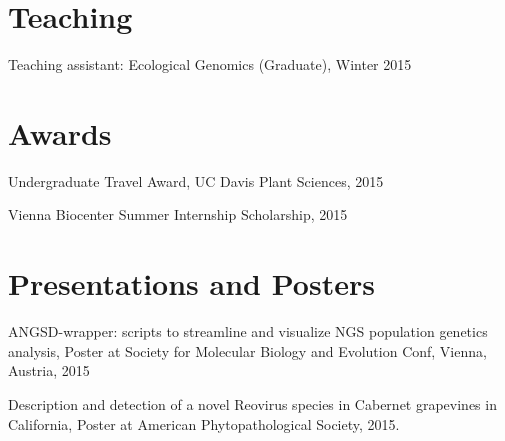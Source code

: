\documentclass[letterpaper]{article}
\renewenvironment{itemize}{
  \begin{list}{}{
    \setlength{\leftmargin}{1em}
  }
}{
  \end{list}
}
\begin{document}
\section*{Teaching}
\begin{itemize}
\item Teaching assistant: Ecological Genomics (Graduate), Winter 2015
\end{itemize}

\section*{Awards}
\begin{itemize}
\item Undergraduate Travel Award, UC Davis Plant Sciences, 2015
\item Vienna Biocenter Summer Internship Scholarship, 2015
\end{itemize}

\section*{Presentations and Posters}
\begin{itemize}
\item ANGSD-wrapper: scripts to streamline and visualize NGS population genetics analysis, Poster at Society for Molecular Biology and Evolution Conf, Vienna, Austria, 2015
\item Description and detection of a novel Reovirus species in Cabernet grapevines in California, Poster at American Phytopathological Society, 2015.
\end{itemize}

\end{document}
